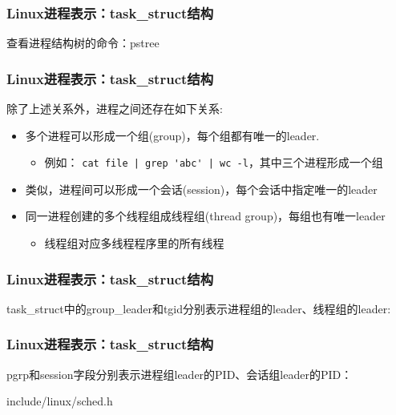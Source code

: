 \documentclass[xcolor=svgnames]{beamer}
\begin{document}
\begin{CJK*}{UTF8}{gbsn}
\begin{frame}[fragile]
\frametitle{Linux进程表示：task\_struct结构}
查看进程结构树的命令：pstree
\end{frame}

\begin{frame}[fragile]
\frametitle{Linux进程表示：task\_struct结构}
除了上述关系外，进程之间还存在如下关系:
\begin{itemize}
\item 多个进程可以形成一个组(group)，每个组都有唯一的leader.
\begin{itemize}
\item 例如： \verb=cat file | grep 'abc' | wc -l=，其中三个进程形成一个组
\end{itemize}
\item 类似，进程间可以形成一个会话(session)，每个会话中指定唯一的leader
\item 同一进程创建的多个线程组成线程组(thread group)，每组也有唯一leader
\begin{itemize}
\item 线程组对应多线程程序里的所有线程
\end{itemize}
\end{itemize}
\end{frame}

\begin{frame}[fragile]
\frametitle{Linux进程表示：task\_struct结构}
task\_struct中的group\_leader和tgid分别表示进程组的leader、线程组的leader:

\lstotherrelations
\end{frame}

\begin{frame}[fragile]
\frametitle{Linux进程表示：task\_struct结构}
pgrp和session字段分别表示进程组leader的PID、会话组leader的PID：
\begin{block}{include/linux/sched.h}
\lstsignalstruct
\end{block}
\end{frame}


\end{CJK*}
\end{document}
